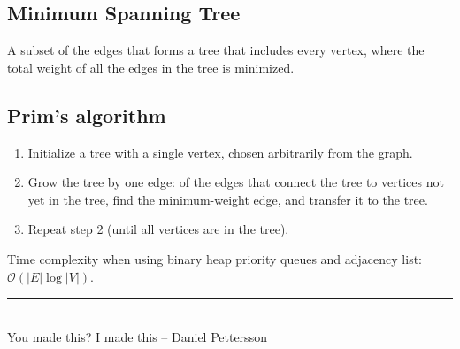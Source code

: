 \documentclass[a4paper,landscape]{article}
\def\author{Daniel Pettersson}
\theoremstyle{definition}
\begin{document}
\begin{multicols*}{3}
\section{Minimum Spanning Tree}
A subset of the edges that forms a tree that includes every vertex,
where the total weight of all the edges in the tree is minimized.

\subsection{Prim's algorithm}
\begin{enumerate}
	\item Initialize a tree with a single vertex, chosen arbitrarily from the graph.
	\item Grow the tree by one edge: of the edges that connect the tree to
		vertices not yet in the tree, find the minimum-weight edge, and
		transfer it to the tree.
	\item Repeat step 2 (until all vertices are in the tree).
\end{enumerate}
Time complexity when using binary heap priority queues and adjacency list:
$\mathcal{O}(\vert{E}\vert \log \vert{V}\vert)$.


\vfill
\rule{0.38\linewidth}{0.4pt} \\
You made this? I made this -- \author

\end{multicols*}
\end{document}

